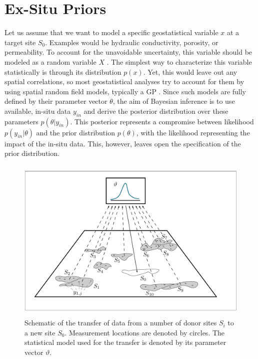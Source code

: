 
\section{Ex-Situ Priors}

Let us assume that we want to model a specific geostatistical variable $x$  at a target site $S_0$. 
Examples would be hydraulic conductivity, porosity, or permeability. 
To account for the unavoidable uncertainty, this variable should be modeled as a random variable $X$ \citep{Pyrcz2002, Rubin2003, Kitanidis2008}. 
The simplest way to characterize this variable statistically is through its distribution $p(x)$. 
Yet, this would leave out any spatial correlations, so most geostatistical analyses try to account for them by using spatial random field models, typically a GP \citep{Rasmussen2006, Gelfand2016}. 
Since such models are fully defined by their parameter vector $\theta$, the aim of Bayesian inference is to use available, in-situ data $y_{in}$ and derive the posterior distribution over these parameters $p(\theta|y_{in})$. 
This posterior represents a compromise between likelihood $p(y_{in}|\theta)$ and the prior distribution $p(\theta)$, with the likelihood representing the impact of the in-situ data. 
This, however, leaves open the specification of the prior distribution. 

\begin{figure}[ht]
    \centering
    \includegraphics[width=1.0\textwidth]{img/regionalization.pdf}
    \caption{Schematic of the transfer of data from a number of donor sites $S_i$ to a new site $S_0$. Measurement locations are denoted by circles. The statistical model used for the transfer is denoted by its parameter vector $\vartheta$.}
    \label{fig:regionalzation}
\end{figure}


